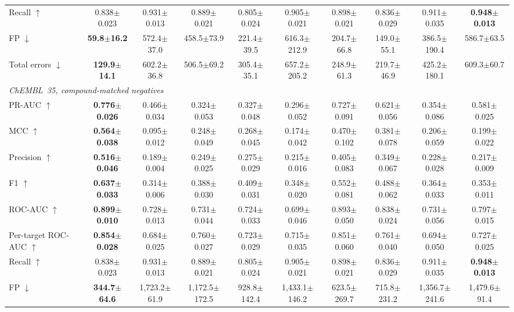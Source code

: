 \documentclass[10pt,letterpaper]{article}
\begin{document}
\begin{table}[t!]
{\begin{tabular}{l c c c c c c c c c}
Recall $\uparrow$ & 0.838$\pm$0.023 & 0.931$\pm$0.013 & 0.889$\pm$0.021 & 0.805$\pm$0.024 & 0.905$\pm$0.021 & 0.898$\pm$0.021 & 0.836$\pm$0.029 & 0.911$\pm$0.035 & \textbf{0.948$\pm$0.013} \\
FP $\downarrow$ & \textbf{59.8$\pm$16.2} & 572.4$\pm$37.0 & 458.5$\pm$73.9 & 221.4$\pm$39.5 & 616.3$\pm$212.9 & 204.7$\pm$66.8 & 149.0$\pm$55.1 & 386.5$\pm$190.4 & 586.7$\pm$63.5 \\
Total errors $\downarrow$ & \textbf{129.9$\pm$14.1} & 602.2$\pm$36.8 & 506.5$\pm$69.2 & 305.4$\pm$35.1 & 657.2$\pm$205.2 & 248.9$\pm$61.3 & 219.7$\pm$46.9 & 425.2$\pm$180.1 & 609.3$\pm$60.7 \\
\midrule
\multicolumn{10}{l}{\textit{ChEMBL~35, compound-matched negatives}} \\
PR-AUC $\uparrow$ & \textbf{0.776$\pm$0.026} & 0.466$\pm$0.034 & 0.324$\pm$0.053 & 0.327$\pm$0.048 & 0.296$\pm$0.052 & 0.727$\pm$0.091 & 0.621$\pm$0.056 & 0.354$\pm$0.086 & 0.581$\pm$0.025 \\
MCC $\uparrow$ & \textbf{0.564$\pm$0.038} & 0.095$\pm$0.012 & 0.248$\pm$0.049 & 0.268$\pm$0.045 & 0.174$\pm$0.042 & 0.470$\pm$0.102 & 0.381$\pm$0.078 & 0.206$\pm$0.059 & 0.199$\pm$0.022 \\
Precision $\uparrow$ & \textbf{0.516$\pm$0.046} & 0.189$\pm$0.004 & 0.249$\pm$0.025 & 0.275$\pm$0.029 & 0.215$\pm$0.016 & 0.405$\pm$0.083 & 0.349$\pm$0.067 & 0.228$\pm$0.028 & 0.217$\pm$0.009 \\
F1 $\uparrow$ & \textbf{0.637$\pm$0.033} & 0.314$\pm$0.006 & 0.388$\pm$0.030 & 0.409$\pm$0.031 & 0.348$\pm$0.020 & 0.552$\pm$0.081 & 0.488$\pm$0.062 & 0.364$\pm$0.033 & 0.353$\pm$0.011 \\
ROC-AUC $\uparrow$ & \textbf{0.899$\pm$0.010} & 0.728$\pm$0.013 & 0.731$\pm$0.044 & 0.724$\pm$0.033 & 0.699$\pm$0.046 & 0.893$\pm$0.050 & 0.838$\pm$0.024 & 0.731$\pm$0.056 & 0.797$\pm$0.015 \\
Per-target ROC-AUC $\uparrow$ & \textbf{0.854$\pm$0.028} & 0.684$\pm$0.025 & 0.760$\pm$0.027 & 0.723$\pm$0.029 & 0.715$\pm$0.035 & 0.851$\pm$0.060 & 0.761$\pm$0.040 & 0.694$\pm$0.050 & 0.727$\pm$0.025 \\
Recall $\uparrow$ & 0.838$\pm$0.023 & 0.931$\pm$0.013 & 0.889$\pm$0.021 & 0.805$\pm$0.024 & 0.905$\pm$0.021 & 0.898$\pm$0.021 & 0.836$\pm$0.029 & 0.911$\pm$0.035 & \textbf{0.948$\pm$0.013} \\
FP $\downarrow$ & \textbf{344.7$\pm$64.6} & 1,723.2$\pm$61.9 & 1,172.5$\pm$172.5 & 928.8$\pm$142.4 & 1,433.1$\pm$146.2 & 623.5$\pm$269.7 & 715.8$\pm$231.2 & 1,356.7$\pm$241.6 & 1,479.6$\pm$91.4 \\

\end{tabular}}
\end{table}
\end{document}
